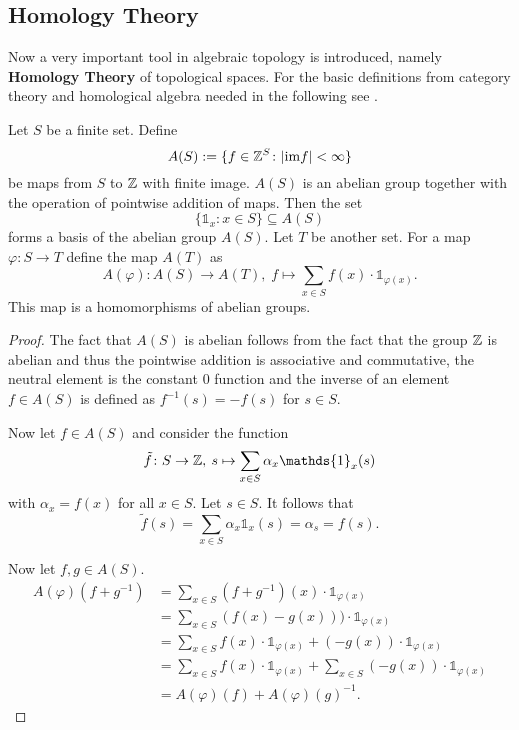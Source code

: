 \subsection{Homology Theory}
Now a very important tool in algebraic topology is introduced, namely \textbf{Homology Theory} of topological spaces. For the basic definitions from category theory and homological algebra needed in the following see \cite{rotman2009}.  

\begin{cons}
  Let $S$ be a finite set. Define \[A(S) := \{f \in \mathbb{Z}^S\colon |{\rm im} f| < \infty \}\] be maps from $S$ to $\mathbb{Z}$ with finite image. $A(S)$ is an abelian group together with the operation of pointwise addition of maps.
  Then the set \[\{\mathds{1}_x\colon x\in S\} \subseteq A(S)\] forms a basis of the abelian group $A(S)$.
  Let $T$ be another set. For a map $\varphi\colon S \to T$ define the map $A(T)$ as
  \begin{equation*}
    A(\varphi)\colon A(S) \to A(T),\; f \mapsto \sum\limits_{x \in S}f(x)\cdot \mathds{1}_{\varphi(x)}.
  \end{equation*}
  This map is a homomorphisms of abelian groups.
\end{cons}

\begin{proof} 
  The fact that $A(S)$ is abelian follows from the fact that the group $\mathbb{Z}$ is abelian and thus the pointwise addition is associative and commutative, the neutral element is the constant $0$ function and the inverse of an element $f \in A(S)$ is defined as $f^{-1}(s) = -f(s)$ for $s \in S$.

  Now let $f \in A(S)$ and consider the function \[\tilde{f}\colon S \to \Z, \: s \mapsto \sum\limits_{x\in S} \alpha_x \mathds{1}_x(s)\] with $\alpha_x = f(x)$ for all $x \in S$. Let $s \in S$. It follows that
  \begin{equation*}
    \tilde{f}(s) = \sum\limits_{x \in S} \alpha_x \mathds{1}_x(s) = \alpha_s = f(s).
  \end{equation*}

  Now let $f,g \in A(S)$.
  \begin{align*}
    A(\varphi)(f+g^{-1}) &= \sum\limits_{x\in S} (f+g^{-1})(x)\cdot \mathds{1}_{\varphi(x)} \\
                        &= \sum\limits_{x\in S} (f(x)-g(x)))\cdot \mathds{1}_{\varphi(x)} \\
                        &= \sum\limits_{x\in S} f(x)\cdot\mathds{1}_{\varphi(x)} + (-g(x))\cdot \mathds{1}_{\varphi(x)} \\
                        &= \sum\limits_{x\in S} f(x)\cdot\mathds{1}_{\varphi(x)} + \sum\limits_{x\in S} (-g(x))\cdot \mathds{1}_{\varphi(x)} \\
                        &= A(\varphi)(f) + A(\varphi)(g)^{-1}.  
  \end{align*}
\end{proof}

